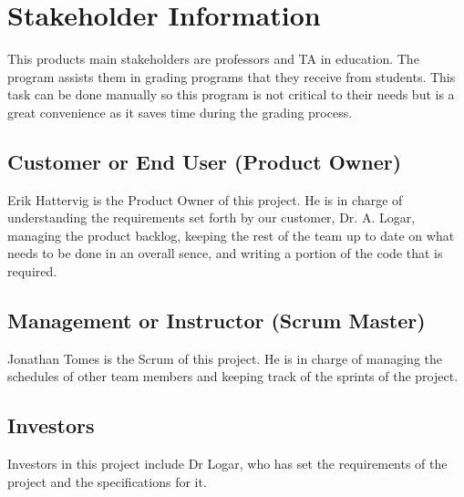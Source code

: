 

\section{ Stakeholder Information}
This products main stakeholders are professors and TA in education.
The program assists them in grading programs that they receive from students. 
This task can be done manually so this program is not critical to their needs but is a 
great convenience as it saves time during the grading process.



\subsection{Customer or End User (Product Owner)}
Erik Hattervig is the Product Owner of this project. He is in charge of understanding the requirements set forth by our
customer, Dr. A. Logar, managing the product backlog, keeping the rest of the team up to date on what
needs to be done in an overall sence, and writing a portion of the code that is required.


\subsection{Management or Instructor (Scrum Master)}
Jonathan Tomes is the Scrum of this project. He is in charge of managing the schedules of other team members
and keeping track of the sprints of the project.



\subsection{Investors}
Investors in this project include Dr Logar, who has set the requirements of the project and the specifications for it.



